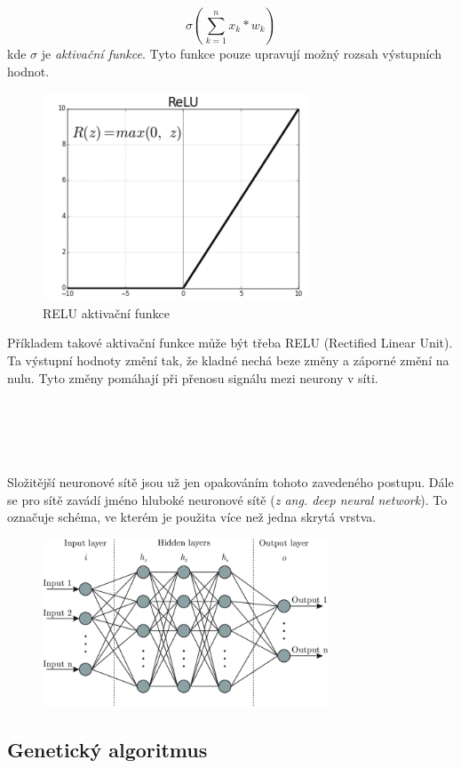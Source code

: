 \documentclass[a4paper,12pt]{article}
\begin{document}
        \begin{equation}
            \sigma(\displaystyle\sum_{k=1}^{n}{x_k * w_k})
        \end{equation}
        kde $\sigma$ je \textit{aktivační funkce}. Tyto funkce pouze upravují možný rozsah výstupních 
        hodnot.
        \begin{figure}
            \centering
            \includegraphics[width=0.8\linewidth]{data/relu.png}
            \caption{RELU aktivační funkce} 
            \label{fig:relu}
        \end{figure}

        \vspace{0.75cm}Příkladem takové aktivační funkce může být třeba RELU (Rectified Linear Unit).
        Ta výstupní hodnoty změní tak, že kladné nechá beze změny a záporné změní na nulu.
        Tyto změny pomáhají při přenosu signálu mezi neurony v síti.
        \\\\\\\\\\\\
        Složitější neuronové sítě jsou už jen opakováním tohoto zavedeného postupu. Dále se pro sítě 
        zavádí jméno hluboké neuronové sítě (\textit{z ang. deep neural network}). 
        To označuje schéma, ve kterém je použita více než jedna skrytá vrstva.
        \begin{figure}[h]
            \centering
            \centering
            \includegraphics[width=0.76\textwidth]{data/nn-scheme.png}
            \label{fig:deepnn}
        \end{figure}

    \subsection{Genetický algoritmus}
\end{document}
